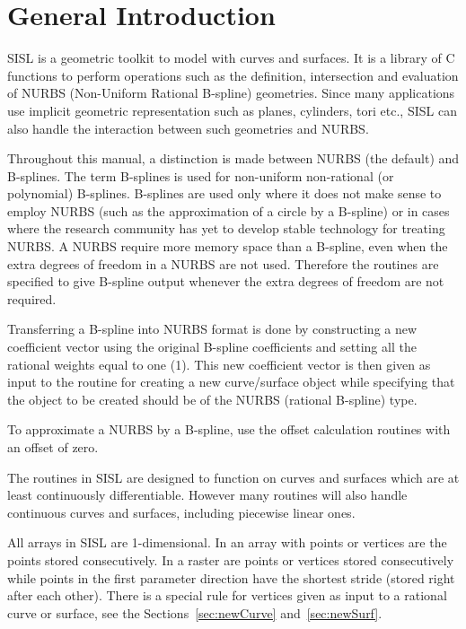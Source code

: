 \chapter{General Introduction}
\label{introduction}
SISL is a geometric toolkit to model with curves and surfaces. It is a
library of C functions to perform operations such as the definition,
intersection and evaluation of NURBS (Non-Uniform Rational B-spline)
geometries. Since many applications use implicit geometric
representation such as planes, cylinders, tori etc., SISL can also
handle the interaction between such geometries and NURBS.

\medskip
Throughout this manual, a distinction is made between NURBS (the
default) and B-splines. The term B-splines is used for non-uniform
non-rational (or polynomial) B-splines. B-splines are used only where it
does not make sense to employ NURBS (such as the approximation of a
circle by a B-spline) or in cases where the research
community has yet to develop stable technology for treating NURBS.
A NURBS require more memory space than a B-spline, even when the
extra degrees of freedom in a NURBS are not used. Therefore the routines
are specified to give B-spline output whenever the extra degrees of
freedom are not required.

Transferring a B-spline into NURBS format is done by constructing a new
coefficient vector using the original B-spline coefficients and setting
all the rational weights equal to one (1).
This new coefficient vector is then given as input to the routine for
creating a new curve/surface object while specifying that the object to
be created should be of the NURBS (rational B-spline) type.

To approximate a NURBS by a B-spline, use the offset calculation
routines with an offset of zero.

The routines in SISL are designed to function on curves and surfaces
which are at least continuously differentiable. However many routines
will also handle continuous curves and surfaces, including piecewise
linear ones.

\medskip
All arrays in SISL are 1-dimensional. In an array with points or vertices
are the points stored consecutively. In a raster are points or vertices
stored consecutively while points in the first parameter direction have
the shortest stride (stored right after each other). There is a special
rule for vertices given as input to a rational curve or surface, see the
Sections~\ref{sec:newCurve} and~\ref{sec:newSurf}.

